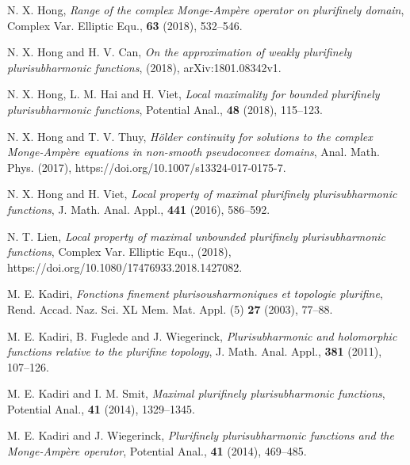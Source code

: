 \documentclass[3p,times]{elsarticle}
\numberwithin{equation}{section}
\newtheorem{The main theorem}[theorem]{The main theorem}
\theoremstyle{definition}
\begin{document}
\begin{thebibliography}{00}


 N. X. Hong, {\em Range of the complex Monge-Amp\`ere operator on plurifinely domain},  Complex Var. Elliptic Equ., {\bf 63} (2018), 532--546.

 N. X. Hong and H. V. Can, {\em On the approximation of weakly   plurifinely plurisubharmonic functions}, (2018), arXiv:1801.08342v1.
 
 N.  X. Hong, L. M. Hai and H. Viet, {\em  Local maximality for bounded plurifinely plurisubharmonic functions}, Potential Anal.,  {\bf  48} (2018),  115--123. 


\bibitem{}  N. X. Hong and T. V. Thuy, {\em H\"older continuity  for solutions to the  complex Monge-Amp\`ere  equations in non-smooth pseudoconvex domains}, Anal. Math. Phys. (2017),   https://doi.org/10.1007/s13324-017-0175-7. 




 N. X. Hong and H. Viet, {\em Local property of maximal plurifinely plurisubharmonic functions}, J. Math. Anal. Appl.,  {\bf 441} (2016),  586--592.

\bibitem{} N. T. Lien, {\em Local property of maximal unbounded plurifinely plurisubharmonic functions},   Complex Var. Elliptic Equ., (2018), https://doi.org/10.1080/17476933.2018.1427082.

 
 M. E. Kadiri, {\em Fonctions finement plurisousharmoniques et topologie plurifine}, Rend. Accad. Naz. Sci. XL Mem. Mat. Appl. (5) {\bf 27} (2003), 77--88.

 M. E. Kadiri, B. Fuglede and J. Wiegerinck,  {\em  Plurisubharmonic and holomorphic functions relative to the plurifine topology}, J. Math. Anal. Appl., {\bf 381} (2011), 107--126.

 M. E. Kadiri and  I. M. Smit, {\em Maximal plurifinely plurisubharmonic functions}, Potential Anal., {\bf 41} (2014), 1329--1345.

 M. E. Kadiri and J. Wiegerinck, {\em Plurifinely plurisubharmonic functions and the Monge-Amp\`{e}re operator}, Potential Anal., {\bf 41} (2014),  469--485.




\end{thebibliography}
\end{document}
